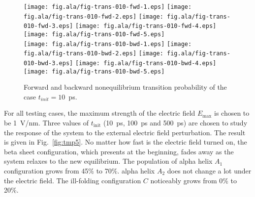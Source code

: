 \documentclass[aip,jcp,a4paper,preprint,onecolumn]{revtex4-1}
\begin{document}
\begin{figure}
  \centering
  \texttt{[image: fig.ala/fig-trans-010-fwd-1.eps]}
  \texttt{[image: fig.ala/fig-trans-010-fwd-2.eps]}
  \texttt{[image: fig.ala/fig-trans-010-fwd-3.eps]}
  \texttt{[image: fig.ala/fig-trans-010-fwd-4.eps]}
  \texttt{[image: fig.ala/fig-trans-010-fwd-5.eps]}\\
  \texttt{[image: fig.ala/fig-trans-010-bwd-1.eps]}
  \texttt{[image: fig.ala/fig-trans-010-bwd-2.eps]}
  \texttt{[image: fig.ala/fig-trans-010-bwd-3.eps]}
  \texttt{[image: fig.ala/fig-trans-010-bwd-4.eps]}
  \texttt{[image: fig.ala/fig-trans-010-bwd-5.eps]}\\
  \caption{Forward and backward nonequilibrium transition probability of the case $t_{init} = 10$~ps.}
  \label{fig:tmp6}
\end{figure}


For all testing cases, the maximum strength of the electric field
$E_{\textrm{max}}$ is chosen to be 1~\textsf{V/nm}.  Three values of
$t_{\textrm{init}}$ (10~\textsf{ps}, 100~\textsf{ps} and
500~\textsf{ps}) are chosen to study the response of the system to the
external electric field perturbation. The result is given in
Fig.~\ref{fig:tmp5}.  No matter how fast is the electric field turned
on, the beta sheet configuration, which presents at the beginning,
fades away as the system relaxes to the new equilibrium. The
population of alpha helix $A_1$ configuration grows from 45\% to 70\%.
alpha helix $A_2$  does not change a lot under the electric field.
The ill-folding configuration $C$ noticeably grows from 0\% to 20\%.
\\
\end{document}
